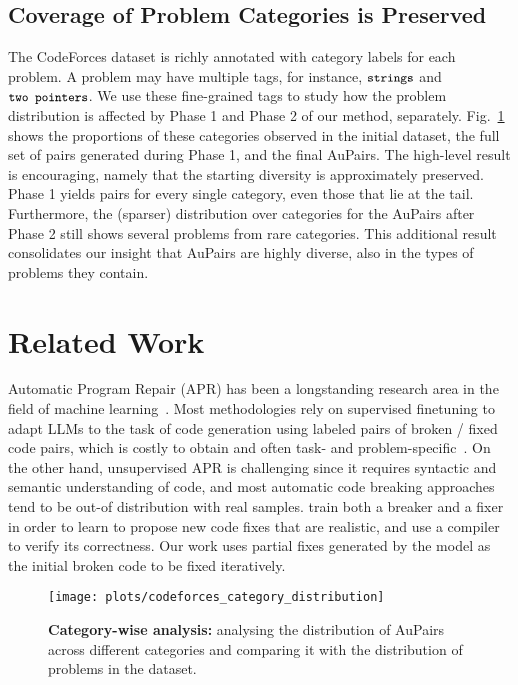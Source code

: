 \documentclass[11pt, a4paper, logo, copyright]{googledeepmind}
\def\aupairs/{\textcolor{golden}{Au}Pairs}
\begin{document}
\subsection{Coverage of Problem Categories is Preserved}
\label{sec:categories}

The CodeForces dataset is richly annotated with category labels for each problem. A problem may have multiple tags, for instance, $\texttt{\small strings}$ and $\texttt{\small two pointers}$. We use these fine-grained tags to study how the problem distribution is affected by Phase 1 and Phase 2 of our method, separately. Fig.~\ref{fig:category_analysis} shows the proportions of these categories observed in the initial dataset, the full set of pairs generated during Phase 1, and the final \aupairs/. The high-level result is encouraging, namely that the starting diversity is approximately preserved. Phase 1 yields pairs for every single category, even those that lie at the tail. Furthermore, the (sparser) distribution over categories for the \aupairs/ after Phase 2 still shows several problems from rare categories. This additional result consolidates our insight that \aupairs/ are highly diverse, also in the types of problems they contain.


\section{Related Work}
\label{sec:related_work}
Automatic Program Repair (APR) has been a longstanding research area in the field of machine learning~\citep{devlin2017semcode, bhatia2016synfix, chen2019sequencer, feng-etal-2020-codebert, berabi2021tfix, codit, circle}. Most methodologies rely on supervised finetuning to adapt LLMs to the task of code generation using labeled pairs of broken / fixed code pairs, which is costly to obtain and often task- and problem-specific~\citep{Hu2022nsedit,cure,xia2022alpharepair, dinella2020hoppity}. On the other hand, unsupervised APR is challenging since it requires syntactic and semantic understanding of code, and most automatic code breaking approaches tend to be out-of distribution with real samples. \citet{yasunaga2021pmlr} train both a breaker and a fixer in order to learn to propose new code fixes that are realistic, and use a compiler to verify its correctness. Our work uses partial fixes generated by the model as the initial broken code to be fixed iteratively.

\begin{figure}[t]
    \centering
    \texttt{[image: plots/codeforces\_category\_distribution]}
    \caption{\textbf{Category-wise analysis:} analysing the distribution of \aupairs/ across different categories and comparing it with the distribution of problems in the dataset.}
    \label{fig:category_analysis}
\end{figure}
\end{document}
